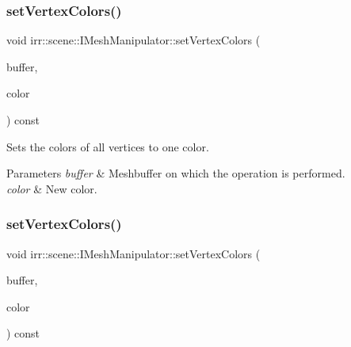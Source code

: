 \subsubsection{\texorpdfstring{set\+Vertex\+Colors()}{setVertexColors()}\hspace{0.1cm}{\footnotesize\ttfamily [3/4]}}
{\footnotesize\ttfamily void irr\+::scene\+::\+I\+Mesh\+Manipulator\+::set\+Vertex\+Colors (\begin{DoxyParamCaption}\item[{\hyperlink{classirr_1_1scene_1_1IMeshBuffer}{I\+Mesh\+Buffer} $\ast$}]{buffer,  }\item[{\hyperlink{classirr_1_1video_1_1SColor}{video\+::\+S\+Color}}]{color }\end{DoxyParamCaption}) const\hspace{0.3cm}{\ttfamily [inline]}}



Sets the colors of all vertices to one color. 


\begin{DoxyParams}{Parameters}
{\em buffer} & Meshbuffer on which the operation is performed. \\
\hline
{\em color} & New color. \\
\hline
\end{DoxyParams}
\mbox{\label{classirr_1_1scene_1_1IMeshManipulator_ab13881bea577e0f0ffc03b102f29db6a}} 
\subsubsection{\texorpdfstring{set\+Vertex\+Colors()}{setVertexColors()}\hspace{0.1cm}{\footnotesize\ttfamily [4/4]}}
{\footnotesize\ttfamily void irr\+::scene\+::\+I\+Mesh\+Manipulator\+::set\+Vertex\+Colors (\begin{DoxyParamCaption}\item[{\hyperlink{classirr_1_1scene_1_1IMeshBuffer}{I\+Mesh\+Buffer} $\ast$}]{buffer,  }\item[{\hyperlink{classirr_1_1video_1_1SColor}{video\+::\+S\+Color}}]{color }\end{DoxyParamCaption}) const\hspace{0.3cm}{\ttfamily [inline]}}



